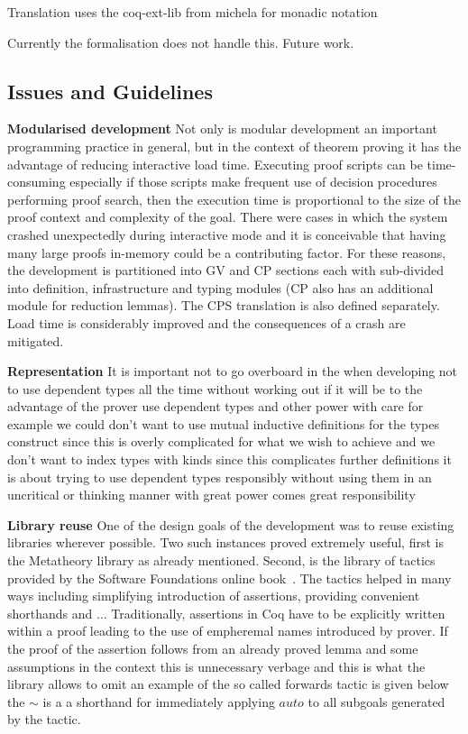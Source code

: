 Translation uses the coq-ext-lib from michela for monadic notation

Currently the formalisation does not handle this. Future work.


\subsection{Issues and Guidelines}

\textbf{Modularised development} Not only is modular development an important
programming practice in general, but in the context of theorem proving it has
the advantage of reducing interactive load time. Executing proof scripts can
be time-consuming especially if those scripts make frequent use of decision
procedures performing proof search, then the execution time is proportional to
the size of the proof context and complexity of the goal. There were cases in
which the system crashed unexpectedly during interactive mode and it is
conceivable that having many large proofs in-memory could be a contributing
factor. For these reasons, the development is partitioned into GV and CP
sections each with sub-divided into definition, infrastructure and typing
modules (CP also has an additional module for reduction lemmas). The CPS
translation is also defined separately. Load time is considerably improved and
the consequences of a crash are mitigated.

\textbf{Representation} It is important not to go overboard in the
when developing not to use dependent types all the time without working out if
it will be to the advantage of the prover use dependent types and other power
with care for example we could don't want to use mutual inductive definitions
for the types construct since this is overly complicated for what we wish to
achieve and we don't want to index types with kinds since this complicates
further definitions it is about trying to use dependent types responsibly
without using them in an uncritical or thinking manner with great power comes
great responsibility

\textbf{Library reuse} One of the design goals of the development was to reuse
existing libraries wherever possible. Two such instances proved extremely
useful, first is the Metatheory library as already mentioned. Second, is the
library of tactics provided by the Software Foundations online book~\cite{SF}.
The tactics helped in many ways including simplifying introduction of
assertions, providing convenient shorthands and ... Traditionally, assertions
in Coq have to be explicitly written within a proof leading to the use of
empheremal names introduced by prover. If the proof of the assertion follows
from an already proved lemma and some assumptions in the context this is
unnecessary verbage and this is what the library allows to omit  an example of the so called forwards tactic is
given below the $\sim$ is a a shorthand for immediately applying \coqe$auto$
to all subgoals generated by the tactic.

